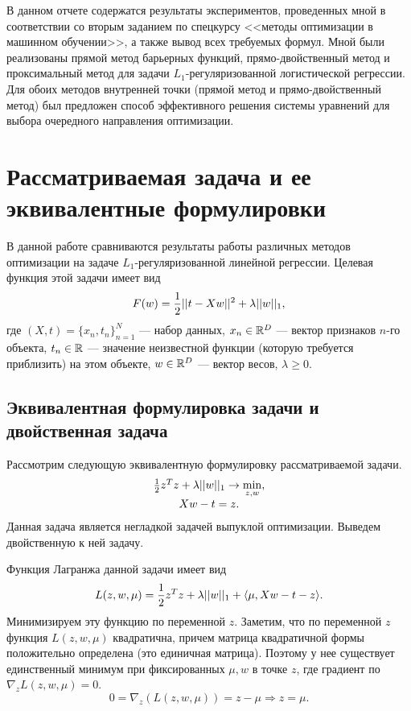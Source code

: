 \documentclass[12pt]{article}
\begin{document}
	\hspace{0.6cm}В данном отчете содержатся результаты экспериментов, проведенных мной в соответствии со вторым заданием по спецкурсу <<методы оптимизации в машинном обучении>>, а также вывод всех требуемых формул. Мной были реализованы прямой метод барьерных функций, прямо-двойственный метод и проксимальный метод для задачи $L_1$-регуляризованной логистической регрессии. Для обоих методов внутренней точки (прямой метод и прямо-двойственный метод) был предложен способ эффективного решения системы уравнений для выбора очередного направления оптимизации.
	
	\section{Рассматриваемая задача и ее эквивалентные формулировки}
	
	\hspace{0.6cm}В данной работе сравниваются результаты работы различных методов оптимизации на задаче $L_1$-регуляризованной линейной регрессии. Целевая функция этой задачи имеет вид
	\begin{equation} \label{loss}
		F(w) = \frac 1 2 ||t - X w||^2 + \lambda || w||_1,
	\end{equation}
	где $(X, t) = \{x_n, t_n\}_{n = 1}^{N}$ — набор данных, $x_n \in \mathbb{R}^D$ — вектор признаков $n$-го объекта, $t_n \in \mathbb{R}$ — значение неизвестной функции (которую требуется приблизить) на этом объекте, $w \in \mathbb{R}^D$ — вектор весов, $\lambda \ge 0$.

	\subsection{Эквивалентная формулировка задачи и двойственная задача}
		Рассмотрим следующую эквивалентную формулировку рассматриваемой задачи.
		\begin{equation}\label{loss_2}
			\begin{array}[l]{c}
				\frac 1 2 z^T z  + \lambda \norm{w}_1 \rightarrow \min\limits_{z, w}, \\
				Xw - t = z.
			\end{array}
		\end{equation}
		Данная задача является негладкой задачей выпуклой оптимизации. Выведем двойственную к ней задачу.
		
		Функция Лагранжа данной задачи имеет вид
		$$L(z, w, \mu) = \frac 1 2 z^T z  + \lambda ||w||_1 + \langle \mu, Xw - t - z \rangle.$$
		Минимизируем эту функцию по переменной $z$. Заметим, что по переменной $z$ функция $L(z, w, \mu)$ квадратична, причем матрица квадратичной формы положительно определена (это единичная матрица). Поэтому у нее существует единственный минимум при фиксированных $\mu, w$ в точке $z$, где градиент по $\nabla_z L(z, w, \mu) = 0$.
		$$0 = \nabla_z(L(z, w, \mu)) = z - \mu \Rightarrow z = \mu.$$
		
\end{document}
